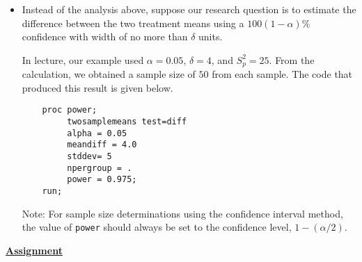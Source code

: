 \documentclass[11pt]{article}
\begin{document}
\begin{itemize}
\item Instead of the analysis above, suppose our research question is to estimate the difference between the two treatment means using a $100(1-\alpha)$\% confidence with width of no more than $\delta$ units. 

In lecture, our example used $\alpha=0.05$, $\delta=4$, and $S_p^2=25$. From the calculation, we obtained a sample size of $50$ from each sample. The code that produced this result is given below. 	
	\begin{verbatim}
	proc power; 
	     twosamplemeans test=diff
	     alpha = 0.05
	     meandiff = 4.0
	     stddev= 5
	     npergroup = .
	     power = 0.975;
	run;
	\end{verbatim}

Note: For sample size determinations using the confidence interval method, the value of \texttt{power} should always be set to the confidence level, $1-(\alpha/2)$. 
\end{itemize}

\newpage

\textbf{\underline{Assignment}}
\end{document}
